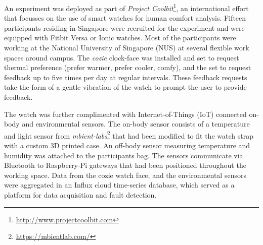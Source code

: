 
An experiment was deployed as part of \emph{Project Coolbit}\footnote{\url{http://www.projectcoolbit.com}}, an international effort that focusses on the use of smart watches for human comfort analysis. Fifteen participants residing in Singapore were recruited for the experiment and were equipped with Fitbit Versa or Ionic watches. Most of the participants were working at the National University of Singapore (NUS) at several flexible work spaces around campus.  The \emph{cozie} clock-face was installed and set to request thermal preference (prefer warmer, prefer cooler, comfy), and the set to request feedback up to five times per day at regular intervals. These feedback requests take the form of a gentle vibration of the watch to prompt the user to provide feedback.

The watch was further complimented with Internet-of-Things (IoT) connected on-body and environmental sensors. The on-body sensor consists of a temperature and light sensor from \emph{mbient-labs}\footnote{\url{https://mbientlab.com/}} that had been modified to fit the watch strap with a custom 3D printed case. An off-body sensor measuring temperature and humidity was attached to the participants bag. The sensors communicate via Bluetooth to Raspberry-Pi gateways that had been positioned throughout the working space. Data from the cozie watch face, and the environmental sensors were aggregated in an Influx cloud time-series database, which served as a platform for data acquisition and fault detection. 



